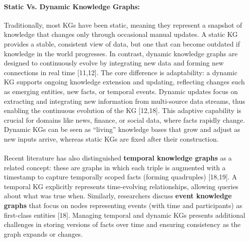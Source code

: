         \paragraph{Static Vs. Dynamic Knowledge Graphs:}
        Traditionally, most KGs have been static, meaning they represent a snapshot of knowledge that changes only through occasional manual updates. A static KG provides a stable, consistent view of data, but one that can become outdated if knowledge in the world progresses. In contrast, dynamic knowledge graphs are designed to continuously evolve by integrating new data and forming new connections in real time [11,12]. The core difference is adaptability: a dynamic KG supports ongoing knowledge extension and updating, reflecting changes such as emerging entities, new facts, or temporal events. Dynamic updates focus on extracting and integrating new information from multi-source data streams, thus enabling the continuous evolution of the KG [12,18]. This adaptive capability is crucial for domains like news, finance, or social data, where facts rapidly change. Dynamic KGs can be seen as “living” knowledge bases that grow and adjust as new inputs arrive, whereas static KGs are fixed after their construction.

        \paragraph{}
        Recent literature has also distinguished \textbf{temporal knowledge graphs} as a related concept: these are graphs in which each triple is augmented with a timestamp to capture temporally scoped facts (forming quadruples) [18,19]. A temporal KG explicitly represents time-evolving relationships, allowing queries about what was true when. Similarly, researchers discuss \textbf{event knowledge graphs} that focus on nodes representing events (with time and participants) as first-class entities [18]. Managing temporal and dynamic KGs presents additional challenges in storing versions of facts over time and ensuring consistency as the graph expands or changes.

